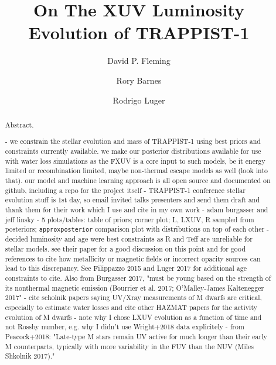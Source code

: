 \documentclass[twocolumn]{aastex62}
\newcommand{\approxposterior}[0]{\texttt{approxposterior}\xspace}
\begin{document}
\title{On The XUV Luminosity Evolution of TRAPPIST-1}



\author{David P. Fleming}

\author{Rory Barnes}

\author{Rodrigo Luger}


\begin{abstract}

Abstract.

- we constrain the stellar evolution and mass of TRAPPIST-1 using best priors and constraints currently available. we make our posterior distributions available for use with water loss simulations as the FXUV is a core input to such models, be it energy limited or recombination limited, maybe non-thermal escape models as well (look into that). our model and machine learning approach is all open source and documented on github, including a repo for the project itself
- TRAPPIST-1 conference stellar evolution stuff is 1st day, so email invited talks presenters and send them draft and thank them for their work which I use and cite in my own work - adam burgasser and jeff linsky
- 5 plots/tables: table of priors; corner plot; L, LXUV, R sampled from posteriors; \approxposterior comparison plot with distributions on top of each other 
- \citet{vanGrootel2018} decided luminosity and age were best constraints as R and Teff are unreliable for stellar models.  see their paper for a good discussion on this point and for good references to cite how metallicity or magnetic fields or incorrect opacity sources can lead to this discrepancy. See Filippazzo 2015 and Luger 2017 for additional age constraints to cite. Also from Burgasser 2017, "must be young based on the strength of its nonthermal magnetic emission (Bourrier et al. 2017; O’Malley-James Kaltenegger 2017"
- cite scholnik papers saying UV/Xray measurements of M dwarfs are critical, especially to estimate water losses and cite other HAZMAT papers for the activity evolution of M dwarfs
- note why I chose LXUV evolution as a function of time and not Rossby number, e.g. why I didn't use Wright+2018 data explicitely
- from Peacock+2018: "Late-type M stars remain UV active for much longer than their early M counterparts, typically with more variability in the FUV than the NUV (Miles Shkolnik 2017)."

\end{abstract}
\end{document}
